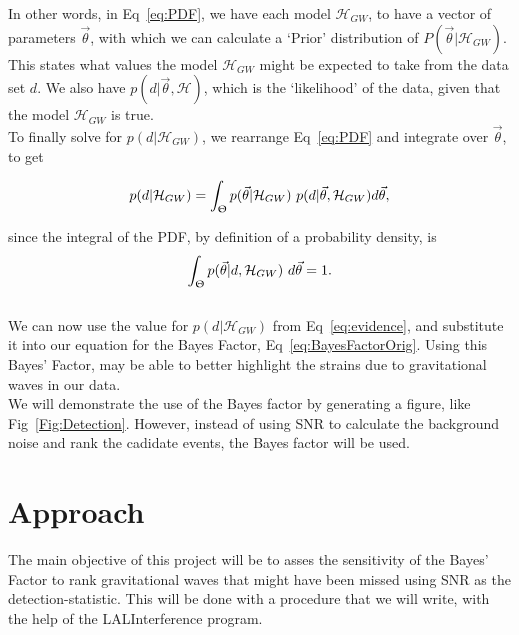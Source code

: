 \documentclass{article}
\begin{document}
In other words, in Eq~\ref{eq:PDF}, we have each model $ \mathcal{H}_{GW}$, to have a vector of parameters $\vec{\theta}$, with which we can calculate a `Prior' distribution of $P(\vec{\theta}| \mathcal{H}_{GW})$. This states what values the model $ \mathcal{H}_{GW}$ might be expected to take from the data set $d$. We also have $p(d|\vec{\theta},  \mathcal{H})$, which is the `likelihood' of the data, given that the model $ \mathcal{H}_{GW}$ is true.\\

To finally solve for $p(d|\mathcal{H}_{GW})$, we rearrange Eq~\ref{eq:PDF} and integrate over $\vec{\theta}$, to get 

\begin{equation} \label{eq:evidence}
 p(d|\mathcal{H}_{GW})    = \int_{\Uptheta} p(\vec{\theta}| \mathcal{H}_{GW}) \ p(d|\vec{\theta},  \mathcal{H}_{GW}) d\vec{\theta},
\end{equation}


since the integral of the PDF, by definition of a probability density, is $$\int_{\Uptheta} p(\vec{\theta}|d, \mathcal{H}_{GW})\ d\vec{\theta}  = 1 .$$ \\

We can now use the value for $p(d|\mathcal{H}_{GW})$ from  Eq~\ref{eq:evidence}, and substitute it into our equation for the Bayes Factor, Eq~\ref{eq:BayesFactorOrig}. Using this Bayes' Factor, may be able to better highlight the strains due to gravitational waves in our data.\\

We will demonstrate the use of the Bayes factor by generating a figure, like Fig~\ref{Fig:Detection}. However, instead of using SNR to calculate the background noise and rank the cadidate events, the Bayes factor will be used. %
 
 
 \section{Approach}
 The main objective of this project will be to asses the sensitivity of the Bayes' Factor to rank gravitational waves that might have been missed using SNR as the detection-statistic. This will be done with a procedure that we will write, with the help of the LALInterference program.\\
 
\end{document}
